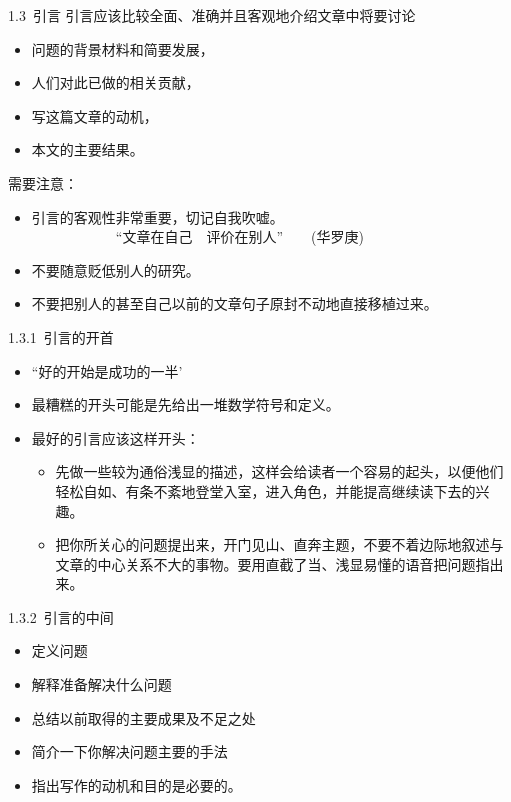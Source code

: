 \documentclass[13pt]{ctexbeamer}
\begin{document}
\begin{frame}{1.3~引言}
	引言应该比较全面、准确并且客观地介绍文章中将要讨论
	\begin{itemize}
		\item 问题的背景材料和简要发展，
		\item 人们对此已做的相关贡献，
		\item 写这篇文章的动机，
		\item 本文的主要结果。
	\end{itemize}
需要注意：
	\begin{itemize}
	\item 引言的客观性非常重要，切记自我吹嘘。\\
	~~~~~~~~~~~~``文章在自己~~评价在别人''~~~~(华罗庚)
	\item 不要随意贬低别人的研究。
	\item 不要把别人的甚至自己以前的文章句子原封不动地直接移植过来。
\end{itemize}
\end{frame}

\begin{frame}{1.3.1~引言的开首}
		\begin{itemize}
		\item ``好的开始是成功的一半'

		\item 最糟糕的开头可能是先给出一堆数学符号和定义。

		\item  最好的引言应该这样开头：
	\begin{itemize}
		\item 先做一些较为通俗浅显的描述，这样会给读者一个容易的起头，以便他们轻松自如、有条不紊地登堂入室，进入角色，并能提高继续读下去的兴趣。
		\item  把你所关心的问题提出来，开门见山、直奔主题，不要不着边际地叙述与文章的中心关系不大的事物。要用直截了当、浅显易懂的语音把问题指出来。
	\end{itemize}
	\end{itemize}
\end{frame}


\begin{frame}{1.3.2~引言的中间}
	\begin{itemize}
		
		\item 定义问题
		
		\item 解释准备解决什么问题
		\item 总结以前取得的主要成果及不足之处
		\item 简介一下你解决问题主要的手法
		\item 指出写作的动机和目的是必要的。
	\end{itemize}
\end{frame}
\end{document}
